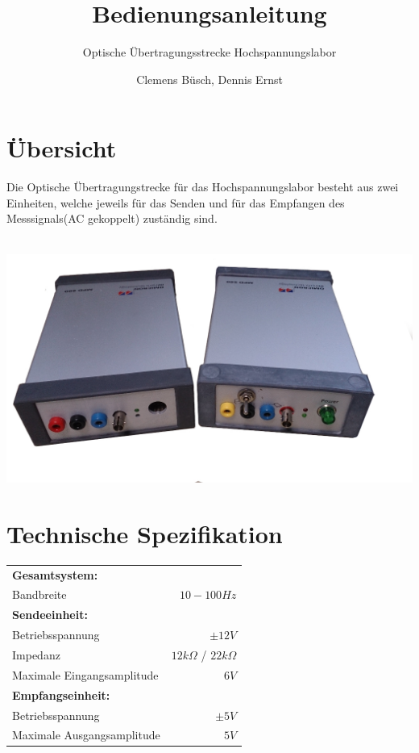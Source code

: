 \documentclass[10pt,a4paper]{scrartcl}
\begin{document}
\title{Bedienungsanleitung}
\author{Clemens Büsch, Dennis Ernst}
\date{}
\subtitle{Optische Übertragungsstrecke Hochspannungslabor}
\maketitle
\tableofcontents

\newpage
\section{Übersicht}
Die Optische Übertragungstrecke für das Hochspannungslabor besteht aus zwei Einheiten, welche jeweils für das Senden und für das Empfangen des Messsignals(AC gekoppelt) zuständig sind.  \\ \\ 
\begin{center}
\includegraphics[scale=0.4]{gfx/title.JPG}
\end{center}


\section{Technische Spezifikation}
\begin{table}[h!]
\centering 
\begin{tabular}{@{} lr @{}}
 \toprule
 \textbf{Gesamtsystem:} \\
 Bandbreite & $10-100 Hz$ \\
  \midrule
  \textbf{Sendeeinheit:} \\
  Betriebsspannung & $\pm 12V$ \\
  Impedanz & $12k\Omega$ / $22k\Omega$   \\
  Maximale Eingangsamplitude & $6 V$\\
  \midrule
  \textbf{Empfangseinheit:}\\
  Betriebsspannung & $\pm 5V$ \\
  Maximale Ausgangsamplitude &$ 5V$\\
  
 \bottomrule
\end{tabular}

\end{table}
\newpage
\end{document}
